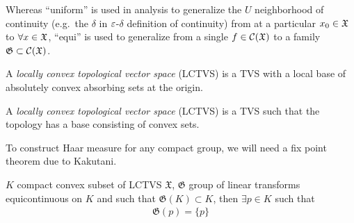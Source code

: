 \begin{remark}
  Whereas ``uniform'' is used in analysis to generalize the $U$ neighborhood of
  continuity (e.g.\ the $\delta$ in $\varepsilon$-$\delta$ definition of continuity)
  from at a particular $x_0 \in \mathfrak{X}$ to $\forall x \in \mathfrak{X}$, ``equi'' is used
  to generalize from a single $f \in \mathcal{C}(\mathfrak{X})$ to a family $\mathfrak{G} \subset
  \mathcal{C}(\mathfrak{X})$.
\end{remark}

\cutthmoff
\begin{definition}
  A \emph{locally convex topological vector space} (LCTVS) is a TVS
  with a local base of absolutely convex absorbing sets at the origin.
\end{definition}
\cutthmon

\begin{definition}[In-Class]
  A \emph{locally convex topological vector space} (LCTVS) is a TVS
  such that the topology has a base consisting of convex sets.
\end{definition}

To construct Haar measure for any compact group, we will need a fix point
theorem due to Kakutani.

\begin{theorem}
  \label{thm:kakutani}
  $K$ compact convex subset of LCTVS $\mathfrak{X}$,
  $\mathfrak{G}$ group of linear transforms equicontinuous on $K$
  and such that $\mathfrak{G}(K) \subset K$,
  then $\exists p \in K$ such that
  \begin{align}
    \mathfrak{G}(p) = \{p\}
  \end{align}
\end{theorem}

